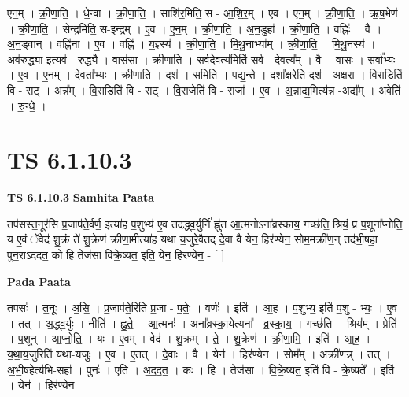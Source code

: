 \documentclass[17pt]{extarticle}
\begin{document}
ए॒न॒म् । क्री॒णा॒ति॒ । धे॒न्वा । क्री॒णा॒ति॒ । साशि॑र॒मिति॒ स - आ॒शि॒र॒म् । ए॒व । ए॒न॒म् । क्री॒णा॒ति॒ । ऋ॒ष॒भेण॑ । क्री॒णा॒ति॒ । सेन्द्र॒मिति॒ स-इ॒न्द्र॒म् । ए॒व । ए॒न॒म् । क्री॒णा॒ति॒ । अ॒न॒डुहा᳚ । क्री॒णा॒ति॒ । वह्निः॑ । वै । अ॒न॒ड्वान् । वह्नि॑ना । ए॒व । वह्नि॑ । य॒ज्ञ्स्य॑ । क्री॒णा॒ति॒ । मि॒थु॒नाभ्या᳚म् । क्री॒णा॒ति॒ । मि॒थु॒नस्य॑ । अव॑रुद्ध्या॒ इत्यव॑ - रु॒द्ध्यै॒ । वास॑सा । क्री॒णा॒ति॒ । स॒र्व॒दे॒व॒त्य॑मिति॑ सर्व - दे॒व॒त्य᳚म् । वै । वासः॑ । सर्वा᳚भ्यः । ए॒व । ए॒न॒म् । दे॒वता᳚भ्यः । क्री॒णा॒ति॒ । दश॑ । समिति॑ । प॒द्य॒न्ते॒ । दशा᳚क्ष॒रेति॒ दश॑ - अ॒क्ष॒रा॒ । वि॒राडिति॑ वि - राट् । अन्न᳚म् । वि॒राडिति॑ वि - राट् । वि॒राजेति॑ वि - राजा᳚ । ए॒व । अ॒न्नाद्य॒मित्य॑न्न -अद्य᳚म् । अवेति॑ । रु॒न्धे॒ ।  \newline




\section*{ TS 6.1.10.3 }

\textbf{TS 6.1.10.3 } \newline
\textbf{Samhita Paata} \newline

तप॑सस्त॒नूर॑सि प्र॒जाप॑ते॒र्वर्ण॒ इत्या॑ह प॒शुभ्य॑ ए॒व तद॑द्ध्व॒र्युर्नि॑ ह्नु॑त आ॒त्मनोऽना᳚व्रस्काय॒ गच्छ॑ति॒ श्रियं॒ प्र प॒शूना᳚प्नोति॒ य ए॒वं ॅवेद॑ शु॒क्रं ते॑ शु॒क्रेण॑ क्रीणा॒मीत्या॑ह यथा य॒जुरे॒वैतद् दे॒वा वै येन॒ हिर॑ण्येन॒ सोम॒मक्री॑ण॒न् तद॑भी॒षहा॒ पुन॒राऽद॑दत॒ को हि तेज॑सा विक्रे॒ष्यत॒ इति॒ येन॒ हिर॑ण्येन॒ - [  ] \newline

\textbf{Pada Paata} \newline

तपसः॑ । त॒नूः । अ॒सि॒ । प्र॒जाप॑ते॒रिति॑ प्र॒जा - प॒तेः॒ । वर्णः॑ । इति॑ । आ॒ह॒ । प॒शुभ्य॒ इति॑ प॒शु - भ्यः॒ । ए॒व । तत् । अ॒द्ध्व॒र्युः । नीति॑ । ह्नु॒ते॒ । आ॒त्मनः॑ । अना᳚व्रस्का॒येत्यना᳚ - व्र॒स्का॒य॒ । गच्छ॑ति । श्रिय᳚म् । प्रेति॑ । प॒शून् । आ॒प्नो॒ति॒ । यः । ए॒वम् । वेद॑ । शु॒क्रम् । ते॒ । शु॒क्रेण॑ । क्री॒णा॒मि॒ । इति॑ । आ॒ह॒ । य॒था॒य॒जुरिति॑ यथा-यजुः । ए॒व । ए॒तत् । दे॒वाः । वै । येन॑ । हिर॑ण्येन । सोम᳚म् । अक्री॑णन्न् । तत् । अ॒भी॒षहेत्य॑भि-सहा᳚ । पुनः॑ । एति॑ । अ॒द॒द॒त॒ । कः । हि । तेज॑सा । वि॒क्रे॒ष्यत॒ इति॑ वि - क्रे॒ष्यते᳚ । इति॑ । येन॑ । हिर॑ण्येन ।  \newline




\end{document}
